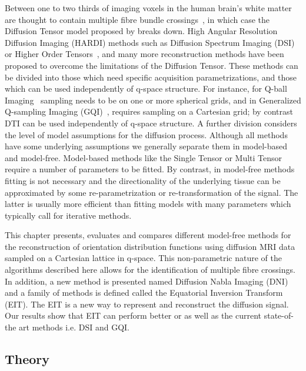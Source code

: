 \documentclass{bioinfo}
\begin{document}
Between one to two thirds of imaging voxels in the human brain's white
matter are thought to contain multiple fibre bundle
crossings~\citep{Behrens2007NeuroImage}, in which case the Diffusion
Tensor model proposed by \citet{Basser1994BiophysicalJ} breaks down. High Angular
Resolution Diffusion Imaging (HARDI) methods \citep{Tuch2002} such as
Diffusion Spectrum Imaging (DSI)~\citep{callaghan1988nmr,
  wedeen2005mapping} or Higher Order
Tensors~\citep{ozarslan2003generalized}, \citet{barmpoutis2009regularized}
and many more reconstruction methods have been proposed to overcome the
limitations of the Diffusion Tensor.  These methods can be divided into
those which need specific acquisition parametrizations, and those which
can be used independently of q-space structure. For instance, for Q-ball
Imaging~\citep{Tuch2004} sampling needs to be on one or more spherical
grids, and in Generalized Q-sampling Imaging (GQI)~\citep{Yeh2010},
requires sampling on a Cartesian grid; by contrast DTI can be used
independently of q-space structure. A further division considers the
level of model assumptions for the diffusion process. Although all
methods have some underlying assumptions we generally separate them in
model-based and model-free. Model-based methods like the Single Tensor
or Multi Tensor require a number of parameters to be fitted. By
contrast, in model-free methods fitting is not necessary and the
directionality of the underlying tissue can be approximated by some
re-parametrization or re-transformation of the signal. The latter is
usually more efficient than fitting models with many parameters which
typically call for iterative methods.

This chapter presents, evaluates and compares different model-free
methods for the reconstruction of orientation distribution functions
using diffusion MRI data sampled on a Cartesian lattice in q-space.
This non-parametric nature of the algorithms described here allows
for the identification of multiple fibre crossings. In addition, a
new method is presented named Diffusion Nabla Imaging (DNI) and a
family of methods is defined called the Equatorial Inversion Transform
(EIT). The EIT is a new way to represent and reconstruct the diffusion
signal. Our results show that EIT can perform better or as well as
the current state-of-the art methods i.e. DSI and GQI.


\subsection{Theory}
\end{document}
